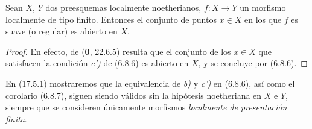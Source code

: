\begin{corollary}[6.8.7]
\label{IV.2.s6.8.7-fr}
Sean $X$, $Y$ dos preesquemas localmente noetherianos, $f:X\to Y$ un
morfismo localmente de tipo finito. Entonces el conjunto de puntos $x\in X$ en los que
$f$ es suave (\textup{o} regular) es abierto en $X$.
\end{corollary}

\begin{proof}
En efecto, de (\textbf 0, 22.6.5) resulta que el conjunto de los $x\in X$ que satisfacen la
condición \emph{c')} de (6.8.6) es abierto en $X$, y se concluye por (6.8.6).
\end{proof}

\begin{remark}[6.8.8]
\label{IV.2.s6.8.8-fr}
En (17.5.1) mostraremos que la equivalencia de \emph{b)} y \emph{c')} en (6.8.6),
así como el corolario (6.8.7), siguen siendo válidos sin la hipótesis noetheriana
en $X$ e $Y$, siempre que se consideren únicamente morfismos \emph{localmente de
presentación finita}.
\end{remark}

